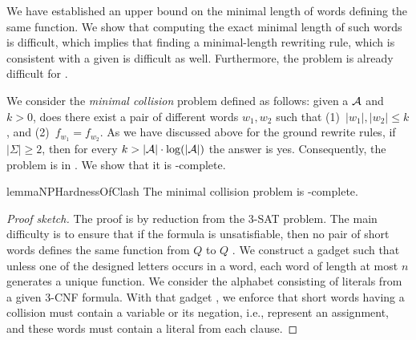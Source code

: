 We have established an upper bound on the minimal length of words defining the same function. 
We show that computing the exact minimal length of such words is difficult, which implies that
finding a minimal-length rewriting rule, which is consistent with a given \DVPA is difficult as well.
Furthermore, the problem is already difficult  for \DFA.

We consider the \emph{minimal collision} problem defined as follows: given a \DFA $\mathcal{A}$ and $k>0$, 
does there exist a pair of different words $w_1, w_2$ such that (1)~$|w_1|,|w_2| \leq k$, and
(2)~$f_{w_1} = f_{w_2}$. As we have discussed above for the ground rewrite rules, if $|\Sigma| \geq 2$, then for every $k > |\mathcal{A}|\cdot \log(|\mathcal{A}|)$ the answer is yes. 
Consequently, the problem is in \NP. We show that it is \NP-complete.

\begin{restatable}{lemma}{NPHardnessOfClash}
The minimal collision problem is \NP-complete.
\end{restatable}
\begin{proof}[Proof sketch]
The proof is by reduction from the 3-SAT problem.
The main difficulty is to ensure that if the formula is unsatisfiable, 
then no pair of short words defines the same function from $Q$ to $Q$ .
We construct a gadget \DFA such that unless one of the designed letters occurs in a word, 
each word of length at most $n$ generates a unique function.
We consider the alphabet consisting of literals from a given 3-CNF formula.
With that gadget \DFA, we enforce that short words having a collision must contain a variable or its negation, i.e., 
represent an assignment, and these words must contain a literal from each clause.
\end{proof}



